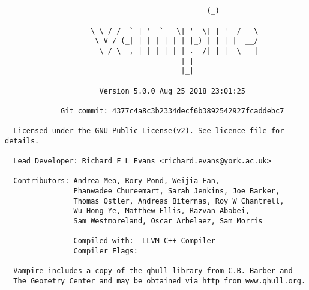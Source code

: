 \begin{minipage}[c]{\textwidth}
\begin{verbatim}

                                                _          
                                               (_)         
                    __   ____ _ _ __ ___  _ __  _ _ __ ___ 
                    \ \ / / _` | '_ ` _ \| '_ \| | '__/ _ \
                     \ V / (_| | | | | | | |_) | | | |  __/
                      \_/ \__,_|_| |_| |_| .__/|_|_|  \___|
                                         | |               
                                         |_|               

                      Version 5.0.0 Aug 25 2018 23:01:25

             Git commit: 4377c4a8c3b2334decf6b3892542927fcaddebc7

  Licensed under the GNU Public License(v2). See licence file for details.

  Lead Developer: Richard F L Evans <richard.evans@york.ac.uk>

  Contributors: Andrea Meo, Rory Pond, Weijia Fan,
                Phanwadee Chureemart, Sarah Jenkins, Joe Barker, 
                Thomas Ostler, Andreas Biternas, Roy W Chantrell,
                Wu Hong-Ye, Matthew Ellis, Razvan Ababei, 
                Sam Westmoreland, Oscar Arbelaez, Sam Morris
 
                Compiled with:  LLVM C++ Compiler
                Compiler Flags: 

  Vampire includes a copy of the qhull library from C.B. Barber and
  The Geometry Center and may be obtained via http from www.qhull.org.

\end{verbatim}
\end{minipage}\\




